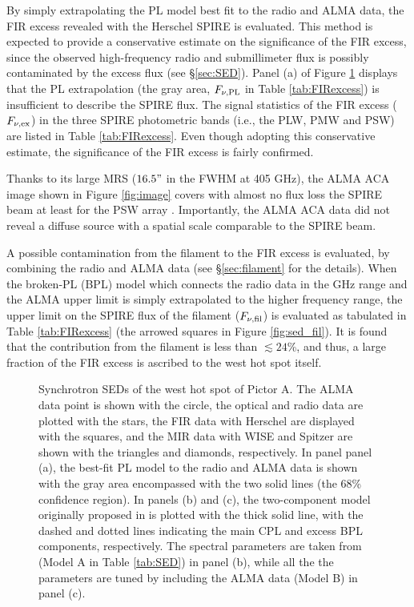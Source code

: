 \documentclass[twocolumn]{aastex631}
\begin{document}
By simply extrapolating the PL model best fit to the radio and ALMA data,
the FIR excess revealed with the Herschel SPIRE \citep{isobe2020}
is evaluated.
This method is expected to provide 
a conservative estimate on the significance of the FIR excess,  
since the observed high-frequency radio and submillimeter flux is
possibly contaminated by the excess flux (see \S\ref{sec:SED}).  
Panel (a) of Figure \ref{fig:sed} displays that the PL extrapolation 
(the gray area, $F_{\nu, {\rm PL}}$ in Table \ref{tab:FIRexcess}) 
is insufficient to describe the SPIRE flux. 
The signal statistics of the FIR excess ($F_{\nu, {\rm ex}}$)
in the three SPIRE photometric bands 
(i.e., the PLW, PMW and PSW)
are listed in Table \ref{tab:FIRexcess}.
Even though adopting this conservative estimate,
the significance of the FIR excess is fairly confirmed. 

Thanks to its large MRS ($16.5"$ in the FWHM at 405 GHz),
the ALMA ACA image shown in Figure \ref{fig:image} covers 
with almost no flux loss
the SPIRE beam at least for the PSW array
\citep[$17.6"$ in the FWHM;][]{griffin2013}.
Importantly, the ALMA ACA data did not reveal 
a diffuse source 
with a spatial scale comparable to the SPIRE beam. 

A possible contamination from the filament to the FIR excess 
is evaluated,
by combining the radio and ALMA data
(see \S \ref{sec:filament} for the details).
When the broken-PL (BPL) model 
which connects the radio data in the GHz range and the ALMA upper limit 
is simply extrapolated to the higher frequency range,
the upper limit on the SPIRE flux of the filament 
($F_{\nu, {\rm fil}}$)
is evaluated as tabulated in Table \ref{tab:FIRexcess}
(the arrowed squares in Figure \ref{fig:sed_fil}).
It is found that the contribution from the filament is 
less than $\lesssim24$\%, and thus,
a large fraction of the FIR excess is ascribed to the west hot spot itself.


\begin{figure}[htbp]
\caption{Synchrotron SEDs of the west hot spot of Pictor A. 
         The ALMA data point is shown with the circle, 
         the optical and radio data \citep{meisenheimer1997} 
         are plotted with the stars, 
         the FIR data with Herschel \citep{isobe2020} %
         are displayed with the squares, and the MIR data with WISE and Spitzer 
         \citep[][and reference therein]{isobe2017} 
         are shown with the triangles and diamonds, respectively.     
         In panel panel (a), the best-fit PL model to the radio and ALMA data
         is shown with the gray area encompassed 
         with the two solid lines (the 68\% confidence region). 
         In panels (b) and (c), the two-component model originally proposed 
         in \citet{isobe2020} is plotted with the thick solid line, 
         with the dashed and dotted lines 
         indicating the main CPL and excess BPL components, respectively.
         The spectral parameters are taken from \citet{isobe2020} (Model A in Table \ref{tab:SED}) in panel (b),
         while all the the parameters are tuned by including the ALMA data 
         (Model B) in panel (c).
         }
\label{fig:sed}
\end{figure}
\end{document}
